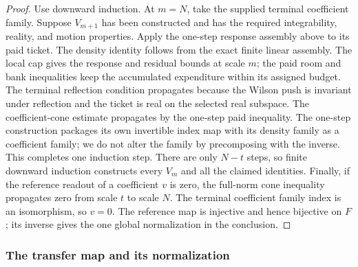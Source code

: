 \begin{proof}
Use downward induction. At $m=N$, take the supplied terminal coefficient family. Suppose $V_{m+1}$ has been constructed and has the required integrability, reality, and motion properties. Apply the one-step response assembly above to its paid ticket. The density identity follows from the exact finite linear assembly. The local cap gives the response and residual bounds at scale $m$; the paid room and bank inequalities keep the accumulated expenditure within its assigned budget. The terminal reflection condition propagates because the Wilson push is invariant under reflection and the ticket is real on the selected real subspace. The coefficient-cone estimate propagates by the one-step paid inequality. The one-step construction packages its own invertible index map with its density family as a coefficient family; we do not alter the family by precomposing with the inverse. This completes one induction step. There are only $N-t$ steps, so finite downward induction constructs every $V_m$ and all the claimed identities. Finally, if the reference readout of a coefficient $v$ is zero, the full-norm cone inequality propagates zero from scale $t$ to scale $N$. The terminal coefficient family index is an isomorphism, so $v=0$. The reference map is injective and hence bijective on $F$; its inverse gives the one global normalization in the conclusion.\end{proof}

\subsubsection{The transfer map and its normalization}

